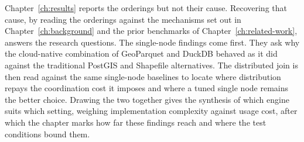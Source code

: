Chapter~\ref{ch:results} reports the orderings but not their cause. Recovering that cause, by reading the orderings against the mechanisms set out in Chapter~\ref{ch:background} and the prior benchmarks of Chapter~\ref{ch:related-work}, answers the research questions. The single-node findings come first. They ask why the cloud-native combination of GeoParquet and DuckDB behaved as it did against the traditional PostGIS and Shapefile alternatives. The distributed join is then read against the same single-node baselines to locate where distribution repays the coordination cost it imposes and where a tuned single node remains the better choice. Drawing the two together gives the synthesis of which engine suits which setting, weighing implementation complexity against usage cost, after which the chapter marks how far these findings reach and where the test conditions bound them.




